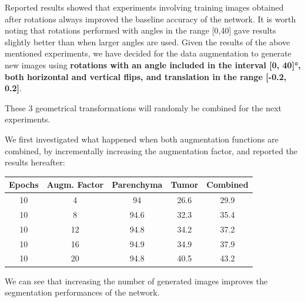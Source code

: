 Reported results showed that experiments involving training images
obtained after rotations always improved the baseline accuracy of the
network. It is worth noting that rotations performed with angles in the
range {[}0,40{]} gave results slightly better than when larger angles are used.
Given the results of the above mentioned experiments, we have decided
for the data augmentation to generate new images using \textbf{rotations
with an angle included in the interval {[}0, 40{]}°, both horizontal and
vertical flips, and translation in the range {[}-0.2, 0.2{]}}.

These 3 geometrical transformations will randomly be combined for the
next experiments.

%

We first investigated what happened when both augmentation functions are
combined, by incrementally increasing the augmentation factor, and
reported the results hereafter:

\begin{longtable}[c]{@{}ccccc@{}}
\toprule
\textbf{Epochs} & \textbf{Augm. Factor} & \textbf{Parenchyma} &
\textbf{Tumor} & \textbf{Combined}\tabularnewline
\midrule
\endhead
10 & 4 & 94 & 26.6 & 29.9\tabularnewline
10 & 8 & 94.6 & 32.3 & 35.4\tabularnewline
10 & 12 & 94.8 & 34.2 & 37.2\tabularnewline
10 & 16 & 94.9 & 34.9 & 37.9\tabularnewline
10 & 20 & 94.8 & 40.5 & 43.2\tabularnewline
\bottomrule
\end{longtable}

We can see that increasing the number of generated images improves the
segmentation performances of the network.

